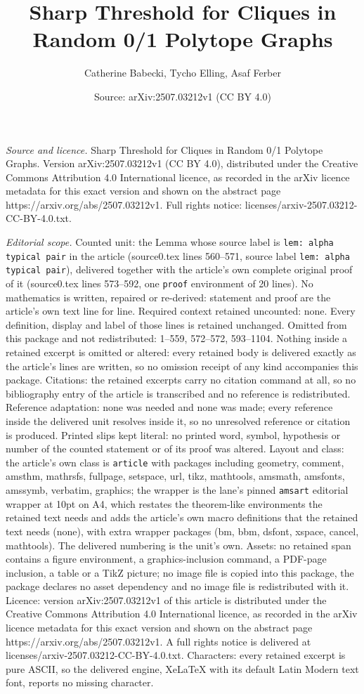 \documentclass[10pt,a4paper]{amsart}
\title[Sharp Threshold for Cliques in Random 0/1 Polytope Graphs]{Sharp Threshold for Cliques in Random 0/1 Polytope Graphs}
\author{Catherine Babecki, Tycho Elling, Asaf Ferber}
\date{Source: arXiv:2507.03212v1 (CC BY 4.0)}
\begin{document}
\maketitle

\noindent\emph{Source and licence.} Sharp Threshold for Cliques in Random 0/1 Polytope Graphs. Version arXiv:2507.03212v1 (CC BY 4.0), distributed under the Creative Commons Attribution 4.0 International licence, as recorded in the arXiv licence metadata for this exact version and shown on the abstract page https://arxiv.org/abs/2507.03212v1. Full rights notice: licenses/arxiv-2507.03212-CC-BY-4.0.txt.\par\smallskip

\noindent\textit{Editorial scope.} Counted unit: the Lemma whose source label is \texttt{lem: alpha typical pair} in the article (source0.tex lines 560--571, source label \texttt{lem: alpha typical pair}), delivered together with the article's own complete original proof of it (source0.tex lines 573--592, one \texttt{proof} environment of 20 lines). No mathematics is written, repaired or re-derived: statement and proof are the article's own text line for line. Required context retained uncounted: none. Every definition, display and label of those lines is retained unchanged. Omitted from this package and not redistributed: 1--559, 572--572, 593--1104. Nothing inside a retained excerpt is omitted or altered: every retained body is delivered exactly as the article's lines are written, so no omission receipt of any kind accompanies this package. Citations: the retained excerpts carry no citation command at all, so no bibliography entry of the article is transcribed and no reference is redistributed. Reference adaptation: none was needed and none was made; every reference inside the delivered unit resolves inside it, so no unresolved reference or citation is produced. Printed slips kept literal: no printed word, symbol, hypothesis or number of the counted statement or of its proof was altered. Layout and class: the article's own class is \texttt{article} with packages including geometry, comment, amsthm, mathrsfs, fullpage, setspace, url, tikz, mathtools, amsmath, amsfonts, amssymb, verbatim, graphics; the wrapper is the lane's pinned \texttt{amsart} editorial wrapper at 10pt on A4, which restates the theorem-like environments the retained text needs and adds the article's own macro definitions that the retained text needs (none), with extra wrapper packages (bm, bbm, dsfont, xspace, cancel, mathtools). The delivered numbering is the unit's own. Assets: no retained span contains a figure environment, a graphics-inclusion command, a PDF-page inclusion, a table or a TikZ picture; no image file is copied into this package, the package declares no asset dependency and no image file is redistributed with it. Licence: version arXiv:2507.03212v1 of this article is distributed under the Creative Commons Attribution 4.0 International licence, as recorded in the arXiv licence metadata for this exact version and shown on the abstract page https://arxiv.org/abs/2507.03212v1. A full rights notice is delivered at licenses/arxiv-2507.03212-CC-BY-4.0.txt. Characters: every retained excerpt is pure ASCII, so the delivered engine, XeLaTeX with its default Latin Modern text font, reports no missing character.
\end{document}

